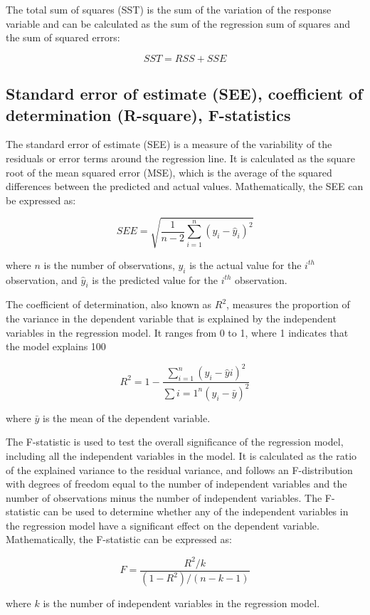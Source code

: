 \documentclass[12pt, a4paper, oneside]{article}
\begin{document}
The total sum of squares (SST) is the sum of the variation of the response variable and can be calculated as the sum of the regression sum of squares and the sum of squared errors:

$$SST = RSS + SSE$$

\subsection{ Standard error of estimate (SEE), coefficient of determination (R-square), F-statistics }
The standard error of estimate (SEE) is a measure of the variability of the residuals or error terms around the regression line. It is calculated as the square root of the mean squared error (MSE), which is the average of the squared differences between the predicted and actual values. Mathematically, the SEE can be expressed as:

$$SEE = \sqrt{\frac{1}{n-2}\sum_{i=1}^{n}(y_i - \hat{y}_i)^2}$$

where $n$ is the number of observations, $y_i$ is the actual value for the $i^{th}$ observation, and $\hat{y}_i$ is the predicted value for the $i^{th}$ observation.

The coefficient of determination, also known as $R^2$, measures the proportion of the variance in the dependent variable that is explained by the independent variables in the regression model. It ranges from 0 to 1, where 1 indicates that the model explains 100%

$$R^2 = 1 - \frac{\sum_{i=1}^{n}(y_i - \hat{y}i)^2}{\sum{i=1}^{n}(y_i - \bar{y})^2}$$

where $\bar{y}$ is the mean of the dependent variable.

The F-statistic is used to test the overall significance of the regression model, including all the independent variables in the model. It is calculated as the ratio of the explained variance to the residual variance, and follows an F-distribution with degrees of freedom equal to the number of independent variables and the number of observations minus the number of independent variables. The F-statistic can be used to determine whether any of the independent variables in the regression model have a significant effect on the dependent variable. Mathematically, the F-statistic can be expressed as:

$$F = \frac{R^2 / k}{(1-R^2) / (n-k-1)}$$

where $k$ is the number of independent variables in the regression model.
\end{document}
